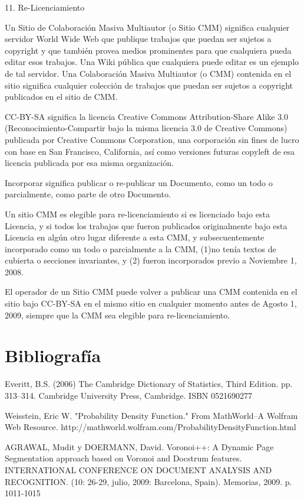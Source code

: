 \documentclass[a4paper, 11pt, oneside]{report}
\begin{document}
11. Re-Licenciamiento

Un Sitio de Colaboración Masiva Multiautor (o Sitio CMM) significa cualquier servidor World Wide Web que publique trabajos que puedan ser sujetos a copyright y que también provea medios prominentes para que cualquiera pueda editar esos trabajos. Una Wiki pública que cualquiera puede editar es un ejemplo de tal servidor. Una Colaboración Masiva Multiautor (o CMM) contenida en el sitio significa cualquier colección de trabajos que puedan ser sujetos a copyright publicados en el sitio de CMM.

CC-BY-SA significa la licencia Creative Commons Attribution-Share Alike 3.0 (Reconocimiento-Compartir bajo la misma licencia 3.0 de Creative Commons) publicada por Creative Commons Corporation, una corporación sin fines de lucro con base en San Francisco, California, así como versiones futuras copyleft de esa licencia publicada por esa misma organización.

Incorporar significa publicar o re-publicar un Documento, como un todo o parcialmente, como parte de otro Documento.

Un sitio CMM es elegible para re-licenciamiento si es licenciado bajo esta Licencia, y si todos los trabajos que fueron publicados originalmente bajo esta Licencia en algún otro lugar diferente a esta CMM, y subsecuentemente incorporado como un todo o parcialmente a la CMM, (1)no tenía textos de cubierta o secciones invariantes, y (2) fueron incorporados previo a Noviembre 1, 2008.

El operador de un Sitio CMM puede volver a publicar una CMM contenida en el sitio bajo CC-BY-SA en el mismo sitio en cualquier momento antes de Agosto 1, 2009, siempre que la CMM sea elegible para re-licenciamiento.

\chapter{Bibliografía}

Everitt, B.S. (2006) The Cambridge Dictionary of Statistics, Third Edition. pp. 313–314. Cambridge University Press, Cambridge. ISBN 0521690277

Weisstein, Eric W. "Probability Density Function." From MathWorld--A Wolfram Web Resource. http://mathworld.wolfram.com/ProbabilityDensityFunction.html

AGRAWAL, Mudit y DOERMANN, David. Voronoi++: A Dynamic Page Segmentation approach based on Voronoi and Docstrum features. INTERNATIONAL CONFERENCE ON DOCUMENT ANALYSIS AND RECOGNITION. (10: 26-29, julio, 2009: Barcelona, Spain). Memorias, 2009. p. 1011-1015
	
\end{document}
